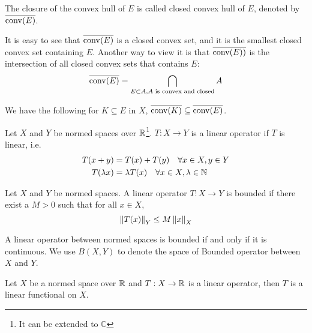 \begin{definition}
   \label{def:closed_convex_hull}
   The closure of the convex hull of $E$ is called closed convex hull of $E$,
   denoted by $\overline{\operatorname*{conv}(E)}$.
\end{definition}

It is easy to see that $\overline{\operatorname*{conv}(E)}$ is a closed convex set, and it is
the smallest closed convex set containing $E$. Another way to view it is that
$\overline{\operatorname*{conv}(E))}$ is the intersection of all closed convex sets that
contains $E$:
\begin{equation}
   \overline{\operatorname*{conv}(E)} = \bigcap_{E \subset A, A \text{ is convex and closed}} A   
\end{equation}

We have the following for $K \subseteq E$ in $X$, $\overline{\operatorname*{conv}(K)} \subseteq
\overline{\operatorname*{conv}(E)}$.





\begin{definition}
   Let $X$ and $Y$ be normed spaces over $\mathbb{R}$\footnote{
       It can be extended to $\mathbb{C}$
   }. $T: X \to Y$ is a linear operator if $T$ is linear, i.e.
   \begin{align*}
      T(x+y)       &= T(x) + T(y) \quad \forall x \in X, y \in Y \\
      T(\lambda x) &= \lambda T(x) \quad \forall x \in X, \lambda \in \mathbb{N}
   \end{align*}
\end{definition}

\begin{definition}
   Let $X$ and $Y$ be normed spaces. A linear operator $T: X \to Y$ is bounded
   if there exist a $M > 0$ such that for all $x \in X$,
   \begin{equation*}
      \left\| T(x) \right\|_{Y} \leq M \left\| x \right\|_{X}
   \end{equation*}
\end{definition}

A linear operator between normed spaces is bounded if and only if it is
continuous. We use $B(X, Y)$ to denote the space of Bounded operator between $X$
and $Y$.

\begin{definition}
   Let $X$ be a normed space over $\mathbb{R}$ and $T: X \to \mathbb{R}$ is a linear operator,
   then $T$ is a linear functional on $X$.
\end{definition}

